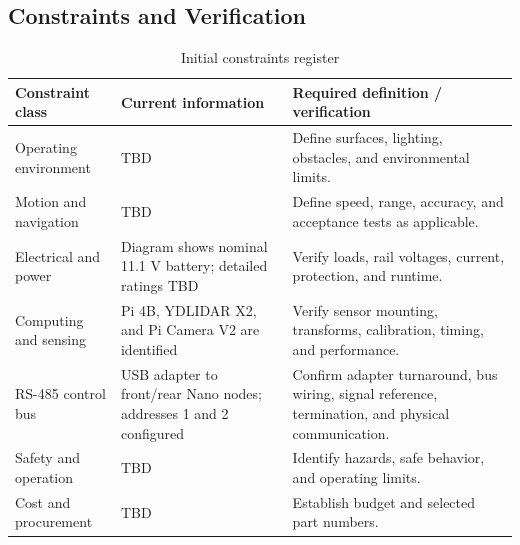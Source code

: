 \subsection{Constraints and Verification}
\begin{table}[!htbp]
    \centering
    \small
    \renewcommand{\arraystretch}{1.4}
    \begin{tabular}{p{3.3cm}p{4.5cm}p{6cm}}
        \toprule
        \textbf{Constraint class} & \textbf{Current information} & \textbf{Required definition / verification} \\
        \midrule
        Operating environment & TBD & Define surfaces, lighting, obstacles, and environmental limits. \\
        Motion and navigation & TBD & Define speed, range, accuracy, and acceptance tests as applicable. \\
        Electrical and power & Diagram shows nominal 11.1 V battery; detailed ratings TBD & Verify loads, rail voltages, current, protection, and runtime. \\
        Computing and sensing & Pi 4B, YDLIDAR X2, and Pi Camera V2 are identified & Verify sensor mounting, transforms, calibration, timing, and performance. \\
        RS-485 control bus & USB adapter to front/rear Nano nodes; addresses 1 and 2 configured & Confirm adapter turnaround, bus wiring, signal reference, termination, and physical communication. \\
        Safety and operation & TBD & Identify hazards, safe behavior, and operating limits. \\
        Cost and procurement & TBD & Establish budget and selected part numbers. \\
        \bottomrule
    \end{tabular}
    \caption{Initial constraints register}
\end{table}
